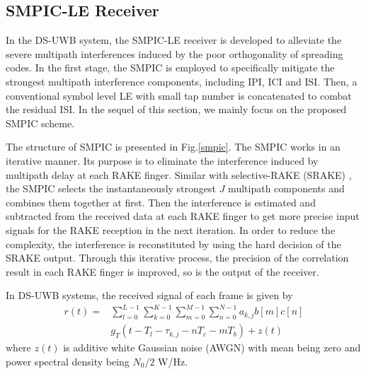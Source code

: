 \documentclass[journal]{IEEEtran}
\begin{document}
\subsection{SMPIC-LE Receiver}

In the DS-UWB system, the SMPIC-LE receiver is developed to
alleviate the severe multipath interferences induced by the poor
orthogonality of spreading codes. In the first stage, the SMPIC is
employed to specifically mitigate the strongest multipath
interference components, including IPI, ICI and ISI. Then, a
conventional symbol level LE with small tap number is concatenated
to combat the residual ISI. In the sequel of this section, we mainly
focus on the proposed SMPIC scheme.

The structure of SMPIC is presented in Fig.\ref{smpic}. The SMPIC
works in an iterative manner. Its purpose is to eliminate the
interference induced by multipath delay at each RAKE finger. Similar
with selective-RAKE (SRAKE) \cite{S-RAKE}, the SMPIC selects the
instantaneously strongest $J$ multipath components and combines them
together at first. Then the interference is estimated and subtracted
from the received data at each RAKE finger to get more precise input
signals for the RAKE reception in the next iteration. In order to
reduce the complexity, the interference is reconstituted by using
the hard decision of the SRAKE output. Through this iterative
process, the precision of the correlation result in each RAKE finger
is improved, so is the output of the receiver.

In DS-UWB systems, the received signal of each frame is given by
\begin{equation}
\label{received data}
\begin{aligned}
r(t)=
&\sum\limits_{l=0}^{L-1}\sum\limits_{k=0}^{K-1}\sum\limits_{m=0}^{M-1}\sum\limits_{n=0}^{N-1}
a_{k,j}b[m]c[n]\\
&g_T(t-T_l-\tau_{k,j}-nT_c-mT_b)+z(t)
\end{aligned}
\end{equation}
where $z(t)$ is additive white Gaussian noise (AWGN) with mean being
zero and power spectral density being $N_0/2$ W/Hz.
\end{document}
